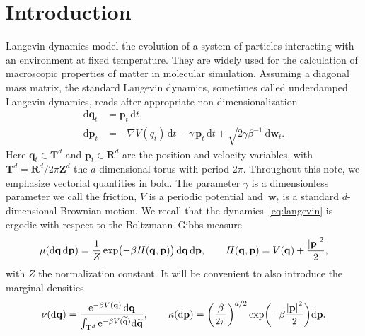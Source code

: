 \documentclass[11pt,a4paper]{article}
\newcommand{\e}{\mathrm{e}}
\newcommand{\real}{\mathbf R}
\newcommand{\integer}{\mathbf Z}
\newcommand{\torus}{\mathbf T}
\newcommand{\grad}{\nabla}
\newcommand{\vect}[1]{\boldsymbol{\mathbf #1}}
\renewcommand{\d}{\mathrm d}
\theoremstyle{plain}
\numberwithin{equation}{section}
\begin{document}
\section{Introduction}%
Langevin dynamics model the evolution of a system of particles interacting with an environment at fixed temperature.
They are widely used for the calculation of macroscopic properties of matter in molecular simulation.
Assuming a diagonal mass matrix,
the standard Langevin dynamics, sometimes called underdamped Langevin dynamics,
reads after appropriate non-dimensionalization~\cite[Section 2.2.4]{MR2681239}
\begin{subequations}
\label{eq:langevin}
\begin{align}
    \label{eq:langevin_q}
    \d \vect q_t &= \vect p_t \, \d t, \\
    \label{eq:langevin_p}
    \d \vect p_t &= - \grad V(q_t) \, \d t - \gamma \, \vect p_t \, \d t + \sqrt{2 \gamma \beta^{-1}} \, \d \vect w_t.
\end{align}
\end{subequations}
Here $\vect q_t \in \torus^d$ and $\vect p_t \in \real^d$ are the position and velocity variables,
with~$\torus^d = \real^d / 2\pi \integer^d$ the $d$-dimensional torus with period $2 \pi$.
Throughout this note, we emphasize vectorial quantities in bold.
The parameter $\gamma$ is a dimensionless parameter we call the friction,
$V$ is a periodic potential
and~$\vect w_t$ is a standard $d$-dimensional Brownian motion.
We recall that the dynamics~\eqref{eq:langevin} is ergodic with respect to the Boltzmann--Gibbs measure
\begin{equation}
    \label{eq:invariant_measure}
    \mu(\d \vect q \, \d \vect p) = \frac{1}{Z} \exp \bigl( - \beta H(\vect q, \vect p)  \bigr) \, \d \vect q \, \d \vect p,
    \qquad H(\vect q, \vect p) = V(\vect q) + \frac{\abs{\vect p}^2}{2},
\end{equation}
with $Z$ the normalization constant.
It will be convenient to also introduce the marginal densities
\begin{equation}
    \label{eq:definition_prob_measures}
    \nu(\d \vect q) = \frac{\e^{- \beta V(\vect q)} \, \d \vect q}{\int_{\torus^d}\e^{-\beta V(\widetilde {\vect q})} \d \widetilde {\vect q}},
    \qquad \kappa(\d \vect p) = \left( \frac{\beta}{2 \pi} \right)^{d/2}\exp \biggl( - \beta \frac{\abs*{\vect p}^2}{2} \biggr) \d \vect p.
\end{equation}
\end{document}
